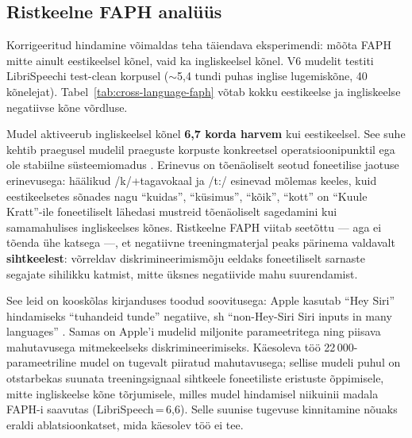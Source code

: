 \subsection{Ristkeelne FAPH analüüs}

Korrigeeritud hindamine võimaldas teha täiendava eksperimendi: mõõta FAPH mitte ainult eestikeelsel kõnel, vaid ka ingliskeelsel kõnel. V6 mudelit testiti LibriSpeechi test-clean korpusel \cite{librispeech2015} ($\sim$5,4 tundi puhas inglise lugemiskõne, 40 kõnelejat). Tabel~\ref{tab:cross-language-faph} võtab kokku eestikeelse ja ingliskeelse negatiivse kõne võrdluse.

\begin{table}[H]
\centering
\caption{V6 mudeli FAPH eri keelte korpustel (lävi\,=\,0,97).}
\label{tab:cross-language-faph}
\small
{}
\end{table}

Mudel aktiveerub ingliskeelsel kõnel \textbf{6,7 korda harvem} kui eestikeelsel. See suhe kehtib praegusel mudelil praeguste korpuste konkreetsel operatsioonipunktil ega ole stabiilne süsteemiomadus \cite{lopezespejo2021deepkws}. Erinevus on tõenäoliselt seotud foneetilise jaotuse erinevusega: häälikud /k/+tagavokaal ja /t:/ esinevad mõlemas keeles, kuid eestikeelsetes sõnades nagu \enquote{kuidas}, \enquote{küsimus}, \enquote{kõik}, \enquote{kott} on \enquote{Kuule Kratt}-ile foneetiliselt lähedasi mustreid tõenäoliselt sagedamini kui samamahulises ingliskeelses kõnes. Ristkeelne FAPH viitab seetõttu --- aga ei tõenda ühe katsega ---, et negatiivne treeningmaterjal peaks pärinema valdavalt \textbf{sihtkeelest}: võrreldav diskrimineerimismõju eeldaks foneetiliselt sarnaste segajate sihilikku katmist, mitte üksnes negatiivide mahu suurendamist.

See leid on kooskõlas kirjanduses toodud soovitusega: Apple kasutab \enquote{Hey Siri} hindamiseks \enquote{tuhandeid tunde} negatiive, sh \enquote{non-Hey-Siri Siri inputs in many languages} \cite{apple-heysiri2017}. Samas on Apple'i mudelid miljonite parameetritega ning piisava mahutavusega mitmekeelseks diskrimineerimiseks. Käesoleva töö 22\,000-parameetriline mudel on tugevalt piiratud mahutavusega; sellise mudeli puhul on otstarbekas suunata treeningsignaal sihtkeele foneetiliste eristuste õppimisele, mitte ingliskeelse kõne tõrjumisele, milles mudel hindamisel niikuinii madala FAPH-i saavutas (LibriSpeech\,=\,6,6). Selle suunise tugevuse kinnitamine nõuaks eraldi ablatsioonkatset, mida käesolev töö ei tee.

